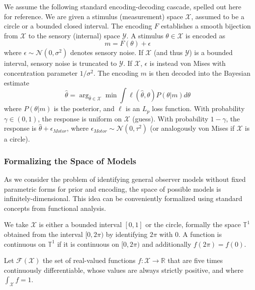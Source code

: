 We assume the following standard encoding-decoding cascade, spelled out here for reference.
We are given a stimulus (measurement) space $\mathcal{X}$, assumed to be a circle or a bounded closed interval.
The encoding $F$ establishes a smooth bijection from $\mathcal{X}$ to the sensory (internal) space $\mathcal{Y}$.
A stimulus $\theta \in \mathcal{X}$ is encoded as
\begin{equation}
    m = F(\theta) + \epsilon
\end{equation}
where $\epsilon \sim \mathcal{N}(0,\sigma^2)$ denotes sensory noise. If $\mathcal{X}$ (and thus $\mathcal{Y}$) is a bounded interval, sensory noise is truncated to $\mathcal{Y}$. If $\mathcal{X}$, $\epsilon$ is instead von Mises with concentration parameter $1/\sigma^2$.
The encoding $m$ is then decoded into the Bayesian estimate
\begin{equation}
    \widehat{\theta} = \arg_{\widehat{\theta}\in\mathcal{X}}\min\int\ell(\hat{\theta},\theta) P(\theta|m)d\theta
\end{equation}
where $P(\theta|m)$ is the posterior, and $\ell$ is an $L_p$ loss function.
With probability $\gamma \in (0,1)$, the response is uniform on $\mathcal{X}$ (guess).
With probability $1-\gamma$, the response is $\widehat{\theta} + \epsilon_{Motor}$, where $\epsilon_{Motor} \sim \mathcal{N}(0,\tau^2)$ (or analogously von Mises if $\mathcal{X}$ is a circle).

\subsubsection{Formalizing the Space of Models}\label{sec:space-of-models}
As we consider the problem of identifying general observer models without fixed parametric forms for prior and encoding, the space of possible models is infinitely-dimensional. This idea can be conveniently formalized using standard  concepts from functional analysis.

We take $\mathcal{X}$ is either a bounded interval $[0,1]$ or the circle, formally the space $\mathbb{T}^1$ obtained from the interval $[0,2\pi)$ by identifying $2\pi$ with $0$.
A function is continuous on $\mathbb{T}^1$ if it is continuous on $[0,2\pi)$ and additionally $f(2\pi) = f(0)$. 

\begin{defin}
Let $\mathcal{F}(\mathcal{X})$ the set of real-valued functions $f : \mathcal{X} \rightarrow \mathbb{R}$ that are five times continuously differentiable, whose values are always strictly positive, and where $\int_{\mathcal{X}} f = 1$.


    
\end{defin}


